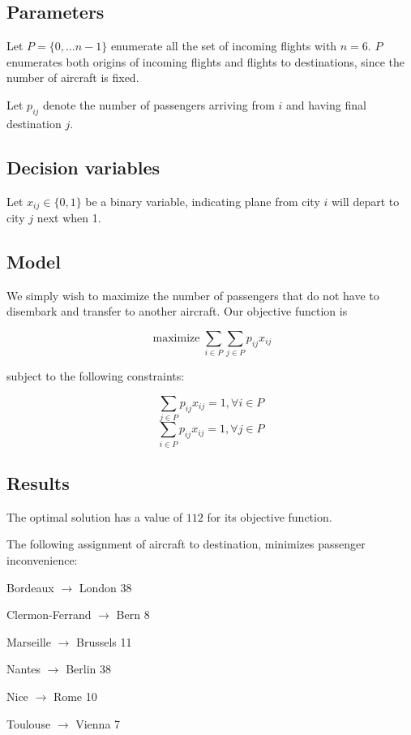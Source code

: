 \documentclass[11pt,oneside]{article}
\DeclareMathOperator*{\maximize}{maximize}
\begin{document}
\subsection{Parameters}

Let $P = \lbrace 0, \ldots n-1\rbrace$ enumerate all the set of incoming flights
with $n=6$. $P$ enumerates both origins of incoming flights and flights to
destinations, since the number of aircraft is fixed.

Let $p_{ij}$ denote the number of passengers arriving from $i$ and having final
destination $j$.

\subsection{Decision variables}

Let $x_{ij}\in \lbrace 0, 1\rbrace$ be a binary variable, indicating plane
from city $i$ will depart to city $j$ next when 1.

\subsection{Model}

We simply wish to maximize the number of passengers that do not have to disembark
and transfer to another aircraft. Our objective function is

$$
\maximize \sum_{i\in P}\sum_{j\in P} p_{ij}x_{ij}
$$

subject to the following constraints:

$$
\sum_{j\in P}p_{ij} x_{ij} = 1, \forall i\in P
$$
$$
\sum_{i\in P}p_{ij} x_{ij} = 1, \forall j\in P
$$

\subsection{Results}

The optimal solution has a value of $112$ for its objective function.

The following assignment of aircraft to destination, minimizes passenger
inconvenience:

Bordeaux $\rightarrow$ London 38

Clermon-Ferrand $\rightarrow$ Bern 8

Marseille $\rightarrow$ Brussels 11

Nantes $\rightarrow$ Berlin 38

Nice $\rightarrow$ Rome 10

Toulouse $\rightarrow$ Vienna 7
\end{document}

